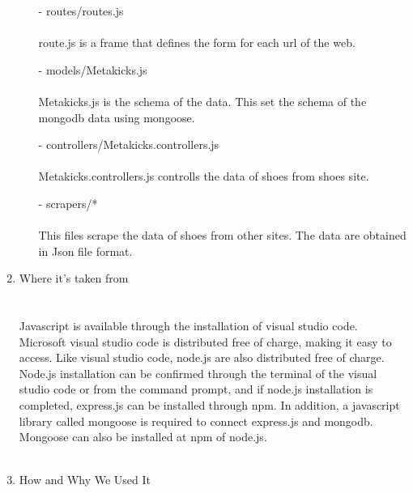\documentclass[conference]{IEEEtran}
\begin{document}
\begin{enumerate}
	\begin{enumerate}
		\item[-] routes/routes.js\\\\
		route.js is a frame that defines the form for each url of the web.\\
	\end{enumerate}
	\begin{enumerate}
		\item[-] models/Metakicks.js\\\\
		Metakicks.js is the schema of the data. This set the schema of the mongodb data using mongoose.\\
	\end{enumerate}
	\begin{enumerate}
		\item[-] controllers/Metakicks.controllers.js\\\\
		Metakicks.controllers.js controlls the data of shoes from shoes site. \\
	\end{enumerate}
	\begin{enumerate}
		\item[-] scrapers/*\\\\
		This files scrape the data of shoes from other sites. The data are obtained in Json file format. \\
	\end{enumerate}
\item Where it's taken from\\
\\\\Javascript is available through the installation of visual studio code. Microsoft visual studio code is distributed free of charge, making it easy to access. Like visual studio code, node.js are also distributed free of charge. Node.js installation can be confirmed through the terminal of the visual studio code or from the command prompt, and if node.js installation is completed, express.js can be installed through npm. In addition, a javascript library called mongoose is required to connect express.js and mongodb. Mongoose can also be installed at npm of node.js.\\\\
\item How and Why We Used It\\

\end{enumerate}
\end{document}
